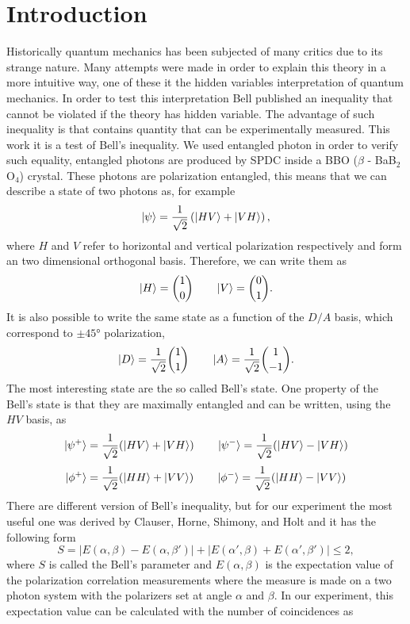 \documentclass[a4paper,10pt]{article}
\begin{document}
\section{Introduction}
Historically quantum mechanics has been subjected of many critics due to its strange nature. Many attempts were made in order to explain this theory in a more intuitive way, one of these it the hidden variables interpretation of quantum mechanics. In order to test this interpretation Bell published an inequality \cite{bellpaper} that cannot be violated if the theory has hidden variable. The advantage of such inequality is that contains quantity that can be experimentally measured. This work it is a test of Bell's inequality. We used entangled photon in order to verify such equality, entangled photons are produced by SPDC inside a BBO ($\beta$ - BaB$_2$O$_4$) crystal. These photons are polarization entangled, this means that we can describe a state of two photons as, for example
\begin{equation}\ket{\psi} = \frac{1}{\sqrt{2}}\left(\ket{HV} + \ket{VH}\right),\end{equation}
where $H$ and $V$ refer to horizontal and vertical polarization respectively and form an two dimensional orthogonal basis. Therefore, we can write them as
\[\ket{H} = \binom{1}{0} \qquad \ket{V} = \binom{0}{1}.\]
It is also possible to write the same state as a function of the $D/A$ basis, which correspond to $\pm 45$° polarization,
\begin{equation}\ket{D} = \frac{1}{\sqrt{2}} \binom{1}{1} \qquad \ket{A} = \frac{1}{\sqrt{2}}\binom{1}{-1}.\end{equation}
The most interesting state are the so called Bell's state. One property of the Bell's state is that they are maximally entangled and can be written, using the $HV$ basis, as
\[\ket{\psi^+} = \frac{1}{\sqrt{2}}(\ket{HV} + \ket{VH}) \qquad \ket{\psi^-} = \frac{1}{\sqrt{2}}(\ket{HV} - \ket{VH})\]
\[\ket{\phi^+} = \frac{1}{\sqrt{2}}(\ket{HH} + \ket{VV}) \qquad \ket{\phi^-} = \frac{1}{\sqrt{2}}(\ket{HH} - \ket{VV})\]
There are different version of Bell's inequality, but for our experiment the most useful one was derived by Clauser, Horne, Shimony, and Holt \cite{inequality} and it has the following form
\begin{equation}\label{Bellinequalityi}S = |E(\alpha,\beta)-E(\alpha,\beta')|+|E(\alpha',\beta)+E(\alpha',\beta')|\leq 2,\end{equation}
where $S$ is called the Bell's parameter and $E(\alpha,\beta)$ is the expectation value of the polarization correlation measurements where the measure is made on a two photon system with the polarizers set at angle $\alpha$ and $\beta.$ In our experiment, this expectation value can be calculated with the number of coincidences as
\end{document}
